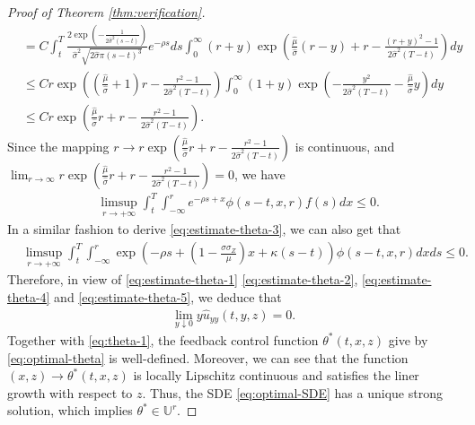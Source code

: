 \documentclass[11pt,times,letter]{article}
\numberwithin{equation}{section}
\begin{document}
\begin{proof}[Proof of Theorem \ref{thm:verification}]
\begin{align}
&=C\int_{t}^{T}\frac{2\exp\left(-\frac{1}{2\hat{\sigma}^2 (s-t)}\right)}{\hat{\sigma}^2\sqrt{2\hat{\sigma} \pi (s-t)^3}}e^{-\rho s}ds\int_{0}^{\infty} ( r+y)\exp\left(\frac{\hat{\mu}}{\hat{\sigma}} (r-y)+r-\frac{( r+y)^2-1}{2\hat{\sigma} ^2(T-t)}\right)dy\nonumber\\
&\leq C r\exp\left(\left(\frac{\hat{\mu}}{\hat{\sigma}}+1\right)r-\frac{r^2-1}{2\hat{\sigma}^2 (T-t)}\right)\int_{0}^{\infty} ( 1+y)\exp\left(-\frac{y^2}{2\hat{\sigma}^2 (T-t)}-\frac{\hat{\mu}}{\hat{\sigma}}y\right)dy\nonumber\\
&\leq Cr\exp\left(\frac{\hat{\mu}}{\hat{\sigma}}r+r-\frac{r^2-1}{2\hat{\sigma}^2 (T-t)}\right).
\end{align}
Since the mapping $r\to r\exp(\frac{\hat{\mu}}{\hat{\sigma}} r+r-\frac{r^2-1}{2\hat{\sigma}^2 (T-t)})$ is continuous, and
$\lim_{r\to\infty}r\exp(\frac{\hat{\mu}}{\hat{\sigma}}r +r-\frac{r^2-1}{2\hat{\sigma}^2 (T-t)})=0$, we have 
\begin{align}\label{eq:estimate-theta-4}
&\limsup_{r\to+\infty}\int_{t}^{T}\int_{-\infty}^{r} e^{-\rho s+x}\phi(s-t,x,r)f(s)dx\leq 0.
\end{align}
In a similar fashion to derive \eqref{eq:estimate-theta-3}, we can also get that
\begin{align}\label{eq:estimate-theta-5}
&\limsup_{r\to+\infty}\int_{t}^{T}\int_{-\infty}^{r} \exp\left(-\rho s+\left(1-\frac{\sigma\sigma_Z}{\mu}\right)x+\kappa(s-t)\right) \phi(s-t,x,r)dx ds\leq 0.
\end{align}
Therefore, in view of \eqref{eq:estimate-theta-1} \eqref{eq:estimate-theta-2}, \eqref{eq:estimate-theta-4} and \eqref{eq:estimate-theta-5}, we deduce that
\begin{align}\label{eq:theta-2}
\lim_{y\downarrow 0} y\hat{u}_{yy}(t,y,z)=0.
\end{align}
Together with \eqref{eq:theta-1}, the  feedback control function $\theta^*(t,x,z)$ give by \eqref{eq:optimal-theta} is well-defined.
Moreover, we can see that the function $(x,z) \to \theta^*(t,x,z)$ is locally Lipschitz continuous and satisfies the liner growth with respect to $z$.
Thus, the SDE \eqref{eq:optimal-SDE} has a unique strong solution, which implies $\theta^*\in\mathbb{U}^r$. 


\end{proof}
\end{document}
